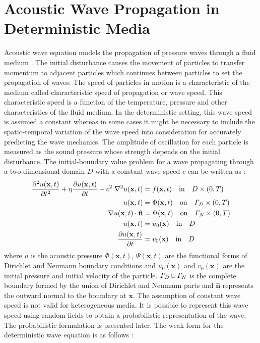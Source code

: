 \documentclass{article}
\begin{document}
\section{Acoustic Wave Propagation in Deterministic Media}\label{sec:det_acousticwave}
Acoustic wave equation models the propagation of pressure waves through a fluid medium \cite{Reynolds}. The initial disturbance causes the movement of particles to transfer momentum to adjacent particles which continues between particles to set the propagation of waves. The speed of particles in motion is a characteristic of the medium called characteristic speed of propagation or wave speed. This characteristic speed is a function of the temperature, pressure and other characteristics of the fluid medium. In the deterministic setting, this wave speed is assumed a constant whereas in some cases it might be necessary to include the spatio-temporal variation of the wave speed into consideration for accurately predicting the wave mechanics. The amplitude of oscillation for each particle is measured as the sound pressure whose strength depends on the initial disturbance. 
The initial-boundary value problem for a wave propagating through a two-dimensional domain ${D}$ with a constant wave speed $c$ can be written as \cite{zampieri2006implicit,Reynolds}:
\begin{align}\label{Eq.acoustic_deter}
\frac{\partial^2 u (\mathbf{x},t) }{\partial t^2} + \eta \frac{\partial u(\mathbf{x},t)}{\partial t} - c^2 \; \nabla^2 u(\mathbf{x},t) &= f(\mathbf{x},t) \quad  \textrm{in} \quad {D} \times (0,T) \\
u(\mathbf{x},t) &= \Phi(\mathbf{x},t) \quad \textrm{on} \quad {\it{\Gamma}}_D \times (0,T) \\
\nabla u(\mathbf{x},t) \cdot \mathbf{\hat{n}} & = \Psi(\mathbf{x},t ) \quad \textrm{on} \quad {\it{\Gamma}}_N \times (0,T) \\
u(\mathbf{x},t) &= u_0(\mathbf{x}) \quad \textrm{in} \quad D \\
\frac{\partial u(\mathbf{x},t)}{\partial t} &= v_0(\mathbf{x}) \quad \textrm{in} \quad D 
\end{align}
where $u$ is the acoustic pressure $\Phi(\mathbf{x},t)$, $\Psi(\mathbf{x},t )$ are the functional forms of Dirichlet and Neumann boundary conditions and $u_0(\mathbf{x})$ and $v_0(\mathbf{x})$ are the initial pressure and initial velocity of the particle. $\it{\Gamma}_D \cup \it{\Gamma}_N $ is the complete boundary formed by the union of Dirichlet and Neumann parts and $\mathbf{\hat{n}}$ represents the outward normal to the boundary at $\mathbf{x}$. The assumption of constant wave speed is not valid for heterogeneous media. It is possible to represent this wave speed using random fields to obtain a probabilistic representation of the wave. The probabilistic formulation is presented later. The weak form for the deterministic wave equation is as follows \cite{zampieri2006implicit}:
\end{document}
